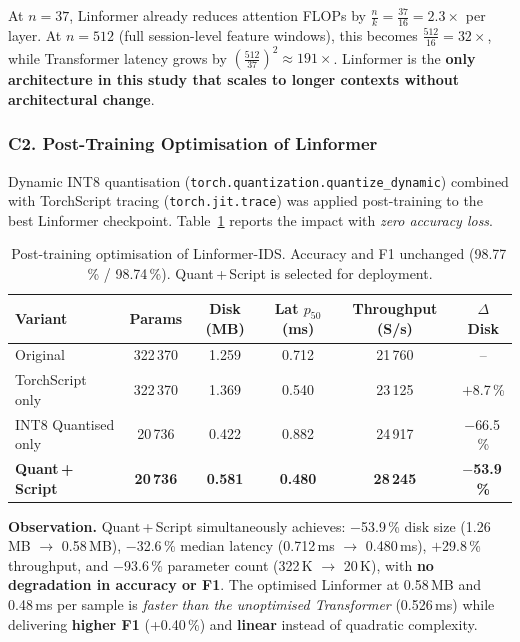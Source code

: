 At $n=37$, Linformer already reduces attention FLOPs by
$\frac{n}{k} = \frac{37}{16} = 2.3\times$ per layer.
At $n=512$ (full session-level feature windows), this becomes
$\frac{512}{16} = 32\times$, while Transformer latency grows by
$\left(\frac{512}{37}\right)^2 \approx 191\times$.
Linformer is the \textbf{only architecture in this study that scales
to longer contexts without architectural change}.

\subsubsection{C2. Post-Training Optimisation of Linformer}

Dynamic INT8 quantisation (\texttt{torch.quantization.quantize\_dynamic})
combined with TorchScript tracing (\texttt{torch.jit.trace}) was applied
post-training to the best Linformer checkpoint.
Table~\ref{tab:optimisation} reports the impact with \emph{zero accuracy loss}.

\begin{table}[h]
\centering
\caption{Post-training optimisation of Linformer-IDS. Accuracy and F1
unchanged (98.77\,\% / 98.74\,\%). Quant\,+\,Script is selected for
deployment.}
\label{tab:optimisation}
\begin{tabular}{lccccc}
\toprule
\textbf{Variant} &
\textbf{Params} &
\textbf{Disk (MB)} &
\textbf{Lat $p_{50}$ (ms)} &
\textbf{Throughput (S/s)} &
\textbf{$\Delta$ Disk} \\
\midrule
Original             & 322\,370 & 1.259 & 0.712 & 21\,760 & --           \\
TorchScript only     & 322\,370 & 1.369 & 0.540 & 23\,125 & $+$8.7\,\%   \\
INT8 Quantised only  &  20\,736 & 0.422 & 0.882 & 24\,917 & $-$66.5\,\%  \\
\textbf{Quant\,+\,Script} & \textbf{20\,736} & \textbf{0.581} & \textbf{0.480} & \textbf{28\,245} & $\mathbf{-}$\textbf{53.9\,\%} \\
\bottomrule
\end{tabular}
\end{table}

\textbf{Observation.}
Quant\,+\,Script simultaneously achieves:
$-$53.9\,\% disk size (1.26\,MB $\to$ 0.58\,MB),
$-$32.6\,\% median latency (0.712\,ms $\to$ 0.480\,ms),
$+$29.8\,\% throughput, and
$-$93.6\,\% parameter count (322\,K $\to$ 20\,K),
with \textbf{no degradation in accuracy or F1}.
The optimised Linformer at 0.58\,MB and 0.48\,ms per sample is
\emph{faster than the unoptimised Transformer} (0.526\,ms) while
delivering \textbf{higher F1} (+0.40\,\%) and \textbf{linear} instead
of quadratic complexity.

